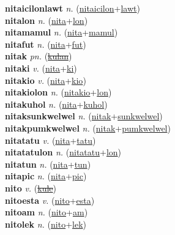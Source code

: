 \textbf{nitaicilonlawt} \textit{n.} (\hyperref[nitaicilon]{nitaicilon}+\hyperref[lawt]{lawt})
 \label{nitaicilonlawt} \\
\textbf{nitalon} \textit{n.} (\hyperref[nita]{nita}+\hyperref[lon]{lon})
 \label{nitalon} \\
\textbf{nitamamul} \textit{n.} (\hyperref[nita]{nita}+\hyperref[mamul]{mamul})
 \label{nitamamul} \\
\textbf{nitafut} \textit{n.} (\hyperref[nita]{nita}+\hyperref[fut]{fut})
 \label{nitafut} \\
\textbf{nitak} \textit{pn.} (\hyperref[kulan]{\sout{kulan}})
 \label{nitak} \\
\textbf{nitaki} \textit{v.} (\hyperref[nita]{nita}+\hyperref[ki]{ki})
 \label{nitaki} \\
\textbf{nitakio} \textit{v.} (\hyperref[nita]{nita}+\hyperref[kio]{kio})
 \label{nitakio} \\
\textbf{nitakiolon} \textit{n.} (\hyperref[nitakio]{nitakio}+\hyperref[lon]{lon})
 \label{nitakiolon} \\
\textbf{nitakuhol} \textit{n.} (\hyperref[nita]{nita}+\hyperref[kuhol]{kuhol})
 \label{nitakuhol} \\
\textbf{nitaksunkwelwel} \textit{n.} (\hyperref[nitak]{nitak}+\hyperref[sunkwelwel]{sunkwelwel})
 \label{nitaksunkwelwel} \\
\textbf{nitakpumkwelwel} \textit{n.} (\hyperref[nitak]{nitak}+\hyperref[pumkwelwel]{pumkwelwel})
 \label{nitakpumkwelwel} \\
\textbf{nitatatu} \textit{v.} (\hyperref[nita]{nita}+\hyperref[tatu]{tatu})
 \label{nitatatu} \\
\textbf{nitatatulon} \textit{n.} (\hyperref[nitatatu]{nitatatu}+\hyperref[lon]{lon})
 \label{nitatatulon} \\
\textbf{nitatun} \textit{n.} (\hyperref[nita]{nita}+\hyperref[tun]{tun})
 \label{nitatun} \\
\textbf{nitapic} \textit{n.} (\hyperref[nita]{nita}+\hyperref[pic]{pic})
 \label{nitapic} \\
\textbf{nito} \textit{v.} (\hyperref[kule]{\sout{kule}})
 \label{nito} \\
\textbf{nitoesta} \textit{v.} (\hyperref[nito]{nito}+\hyperref[esta]{esta})
 \label{nitoesta} \\
\textbf{nitoam} \textit{n.} (\hyperref[nito]{nito}+\hyperref[am]{am})
 \label{nitoam} \\
\textbf{nitolek} \textit{n.} (\hyperref[nito]{nito}+\hyperref[lek]{lek})
 \label{nitolek} \\
